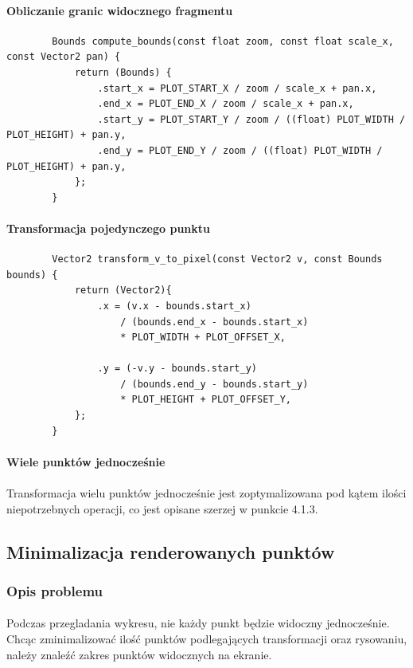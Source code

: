 \documentclass[12pt]{report}
\begin{document}
	\paragraph{Obliczanie granic widocznego fragmentu}
	\begin{verbatim}
		Bounds compute_bounds(const float zoom, const float scale_x, const Vector2 pan) {
			return (Bounds) {
				.start_x = PLOT_START_X / zoom / scale_x + pan.x,
				.end_x = PLOT_END_X / zoom / scale_x + pan.x,
				.start_y = PLOT_START_Y / zoom / ((float) PLOT_WIDTH / PLOT_HEIGHT) + pan.y,
				.end_y = PLOT_END_Y / zoom / ((float) PLOT_WIDTH / PLOT_HEIGHT) + pan.y,
			};
		}
	\end{verbatim}
	
	\paragraph{Transformacja pojedynczego punktu}
	\begin{verbatim}
		Vector2 transform_v_to_pixel(const Vector2 v, const Bounds bounds) {
			return (Vector2){
				.x = (v.x - bounds.start_x)
					/ (bounds.end_x - bounds.start_x)
					* PLOT_WIDTH + PLOT_OFFSET_X,
					
				.y = (-v.y - bounds.start_y)
					/ (bounds.end_y - bounds.start_y)
					* PLOT_HEIGHT + PLOT_OFFSET_Y,
			};
		}
	\end{verbatim}
	
	\paragraph{Wiele punktów jednocześnie}
	\paragraph{}
	Transformacja wielu punktów jednocześnie jest zoptymalizowana pod kątem ilości niepotrzebnych operacji, co jest opisane szerzej w punkcie 4.1.3.
	
	\pagebreak
	\subsection{Minimalizacja renderowanych punktów}
	\subsubsection{Opis problemu}
	\paragraph{}
	Podczas przegladania wykresu, nie każdy punkt będzie widoczny jednocześnie. Chcąc zminimalizować ilość punktów podlegających transformacji oraz rysowaniu, należy znaleźć zakres punktów widocznych na ekranie.
	
\end{document}

